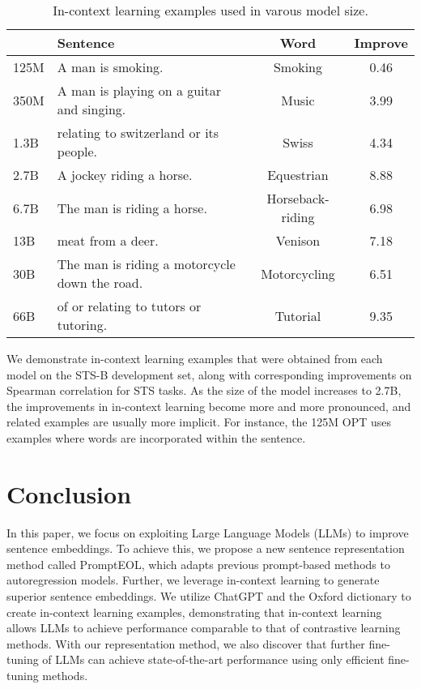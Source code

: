 \documentclass{article}
\begin{document}
\begin{wraptable}[10]{r}{7cm}
\tiny
\centering
\vspace{-18pt}
\begin{tabular}{lp{2.8cm}cc}
\hline
& Sentence & Word & Improve\\
\hline
125M & A man is smoking. & Smoking & 0.46\\
350M & A man is playing on a guitar and singing. & Music & 3.99\\
1.3B & relating to switzerland or its people. & Swiss & 4.34\\
2.7B & A jockey riding a horse. & Equestrian & 8.88\\
6.7B & The man is riding a horse. & Horseback-riding & 6.98\\
13B & meat from a deer. & Venison & 7.18\\
30B & The man is riding a motorcycle down the road. & Motorcycling & 6.51\\
66B & of or relating to tutors or tutoring. & Tutorial & 9.35\\
\hline
\end{tabular}
\caption{ In-context learning examples used in varous model size.
}
\end{wraptable}
We demonstrate in-context learning examples that were obtained from each model on the STS-B development set, along with corresponding improvements on Spearman correlation for STS tasks.
As the size of the model increases to 2.7B, the improvements in in-context learning become more and more pronounced, and related examples are usually more implicit. For instance, the 125M OPT uses examples where words are incorporated within the sentence.

\section{Conclusion}

In this paper, we focus on exploiting Large Language Models (LLMs) to improve sentence embeddings. To achieve this, we propose a new sentence representation method called PromptEOL, which adapts previous prompt-based methods to autoregression models. Further, we leverage in-context learning to generate superior sentence embeddings. We utilize ChatGPT and the Oxford dictionary to create in-context learning examples, demonstrating that in-context learning allows LLMs to achieve performance comparable to that of contrastive learning methods. With our representation method, we also discover that further fine-tuning of LLMs can achieve state-of-the-art performance using only efficient fine-tuning methods.
\end{document}
